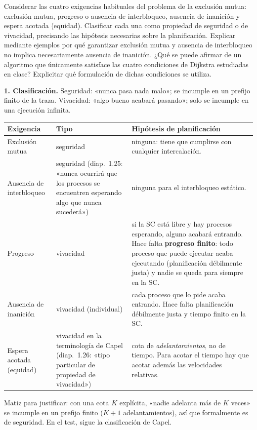 \begin{ejercicio}
Considerar las cuatro exigencias habituales del problema de la exclusión mutua: exclusión mutua, progreso o
ausencia de interbloqueo, ausencia de inanición y espera acotada (equidad). Clasificar cada una como propiedad de
seguridad o de vivacidad, precisando las hipótesis necesarias sobre la planificación. Explicar mediante ejemplos
por qué garantizar exclusión mutua y ausencia de interbloqueo no implica necesariamente ausencia de inanición.
¿Qué se puede afirmar de un algoritmo que únicamente satisface las cuatro condiciones de Dijkstra estudiadas en
clase? Explicitar qué formulación de dichas condiciones se utiliza.
\end{ejercicio}
\begin{solucion}
\textbf{1. Clasificación.} Seguridad: «nunca pasa nada malo»; se incumple en un prefijo finito de la traza.
Vivacidad: «algo bueno acabará pasando»; solo se incumple en una ejecución infinita.
\begin{center}\small
\begin{tabular}{p{3.0cm}p{3.0cm}p{7.0cm}}
\toprule
\textbf{Exigencia} & \textbf{Tipo} & \textbf{Hipótesis de planificación} \\ \midrule
Exclusión mutua & seguridad & ninguna: tiene que cumplirse con cualquier intercalación. \\
Ausencia de interbloqueo & seguridad (diap.\ 1.25: «nunca ocurrirá que los procesos se encuentren esperando algo que nunca sucederá») & ninguna para el interbloqueo estático. \\
Progreso & vivacidad & si la SC está libre y hay procesos esperando, alguno acabará entrando. Hace falta
\textbf{progreso finito}: todo proceso que puede ejecutar acaba ejecutando (planificación débilmente justa) y
nadie se queda para siempre en la SC. \\
Ausencia de inanición & vivacidad (individual) & cada proceso que lo pide acaba entrando. Hace falta
planificación débilmente justa y tiempo finito en la SC. \\
Espera acotada (equidad) & vivacidad en la terminología de Capel (diap.\ 1.26: «tipo particular de propiedad de
vivacidad») & cota de \emph{adelantamientos}, no de tiempo. Para acotar el tiempo hay que acotar además las
velocidades relativas. \\
\bottomrule
\end{tabular}
\end{center}
Matiz para justificar: con una cota $K$ explícita, «nadie adelanta más de $K$ veces» se incumple en un prefijo
finito ($K+1$ adelantamientos), así que formalmente es de seguridad. En el test, sigue la clasificación de Capel.


\end{solucion}
